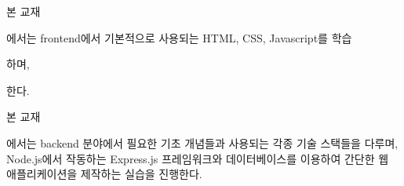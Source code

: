 
\begin{fullstack}
\end{fullstack}
\begin{frontend}
    본 교재
\end{frontend}
\begin{notbackend}
    에서는 frontend에서 기본적으로 사용되는 HTML, CSS, Javascript를 학습
\end{notbackend}
\begin{fullstack}
    하며, 
\end{fullstack}
\begin{frontend}
    한다.
\end{frontend}
\begin{fullstack}
\end{fullstack}
\begin{backend}
    본 교재
\end{backend}
\begin{notfrontend}
    에서는 backend 분야에서 필요한 기초 개념들과 사용되는 각종 기술 스택들을 다루며, Node.js에서 작동하는 Express.js 프레임워크와 데이터베이스를 이용하여 간단한 웹 애플리케이션을 제작하는 실습을 진행한다.
\end{notfrontend}
